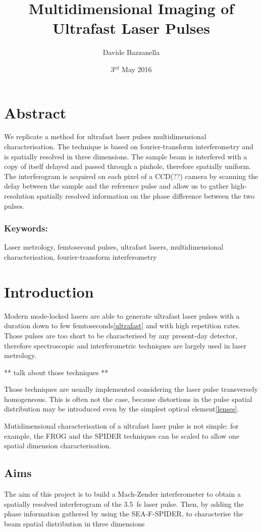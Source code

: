 \documentclass[12pt,a4paper,twoside]{article}
\author{Davide Bazzanella}
\title{Multidimensional Imaging of Ultrafast Laser Pulses}
\date{3$^{\mathrm{rd}}$ May 2016}
\begin{document}

\cleardoublepage
\section*{Abstract}
We replicate a method for ultrafast laser pulses multidimensional characterisation.
The technique is based on fourier-transform interferometry and is spatially resolved in three dimensions.
The sample beam is interfered with a copy of itself delayed and passed through a pinhole, therefore spatially uniform.
The interferogram is acquired on each pixel of a CCD(??) camera by scanning the delay between the sample and the reference pulse and allow us to gather high-resolution spatially resolved information on the phase difference between the two pulses.
\subsubsection*{Keywords:} Laser metrology, femtosecond pulses, ultrafast lasers, multidimensional characterisation, fourier-transform interferometry
\cleardoublepage
\tableofcontents

\cleardoublepage
{}
\section{Introduction}
Modern mode-locked lasers are able to generate ultrafast laser pulses with a duration down to few femtoseconds\ref{ultrafast} and with high repetition rates.
Those pulses are too short to be characterised by any present-day detector, therefore spectroscopic and interferometric techniques are largely used in laser metrology.

** talk about those techniques **

Those techniques are usually implemented considering the laser pulse transversely homogeneous.
This is often not the case, because distortions in the pulse spatial distribution may be introduced even by the simplest optical element\ref{lenses}.

Mutidimensional characterisation of a ultrafast laser pulse is not simple: for example, the FROG and the SPIDER techniques can be scaled to allow one spatial dimension characterisation.

\subsection{Aims}
The aim of this project is to build a Mach-Zender interferometer to obtain a spatially resolved interferogram of the \SI{3.5}{\fs} laser pulse.
Then, by adding the phase information gathered by using the SEA-F-SPIDER, to characterise the beam spatial distribution in three dimensions
\end{document}
